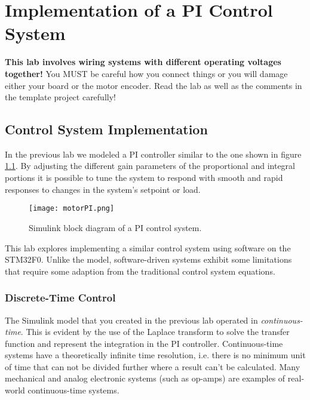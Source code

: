 \documentclass[openany,11pt,fleqn]{book} %
\begin{document}
	
\chapter{Implementation of a PI Control System}

\begin{warning}
    \textbf{This lab involves wiring systems with different operating voltages together!} You MUST be careful how you connect things or you will damage either your board or the motor encoder. Read the lab as well as the comments in the template project carefully!
\end{warning}

\section{Control System Implementation}

In the previous lab we modeled a PI controller similar to the one shown in figure \ref{motorPI}. By adjusting the different gain parameters of the proportional and integral portions it is possible to tune the system to respond with smooth and rapid responses to changes in the system's setpoint or load. 

\begin{figure}[tb]
    \centering\texttt{[image: motorPI.png]}
    \caption{Simulink block diagram of a PI control system.}
    \label{motorPI}
\end{figure}

This lab explores implementing a similar control system using software on the STM32F0. Unlike the model, software-driven systems exhibit some limitations that require some adaption from the traditional control system equations. 

\subsection{Discrete-Time Control}

The Simulink model that you created in the previous lab operated in \textit{continuous-time}. This is evident by the use of the Laplace transform to solve the transfer function and represent the integration in the PI controller. Continuous-time systems have a theoretically infinite time resolution, i.e. there is no minimum unit of time that can not be divided further where a result can't be calculated. Many mechanical and analog electronic systems (such as op-amps) are examples of real-world continuous-time systems. 
\end{document}
